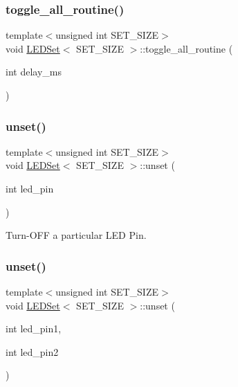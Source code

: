 \mbox{\label{classLEDSet_a61cc024950a5b66dff34c449cc73787f}} 
\subsubsection{\texorpdfstring{toggle\+\_\+all\+\_\+routine()}{toggle\_all\_routine()}}
{\footnotesize\ttfamily template$<$unsigned int S\+E\+T\+\_\+\+S\+I\+ZE$>$ \\
void \hyperlink{classLEDSet}{L\+E\+D\+Set}$<$ S\+E\+T\+\_\+\+S\+I\+ZE $>$\+::toggle\+\_\+all\+\_\+routine (\begin{DoxyParamCaption}\item[{int}]{delay\+\_\+ms }\end{DoxyParamCaption})\hspace{0.3cm}{\ttfamily [inline]}}

\mbox{\label{classLEDSet_aacc3566d74c4051350977b578ada3a4d}} 
\subsubsection{\texorpdfstring{unset()}{unset()}\hspace{0.1cm}{\footnotesize\ttfamily [1/3]}}
{\footnotesize\ttfamily template$<$unsigned int S\+E\+T\+\_\+\+S\+I\+ZE$>$ \\
void \hyperlink{classLEDSet}{L\+E\+D\+Set}$<$ S\+E\+T\+\_\+\+S\+I\+ZE $>$\+::unset (\begin{DoxyParamCaption}\item[{int}]{led\+\_\+pin }\end{DoxyParamCaption})\hspace{0.3cm}{\ttfamily [inline]}}



Turn-\/\+O\+FF a particular L\+ED Pin. 

\mbox{\label{classLEDSet_ac84aa5b9e72689bbfd71f556995dfe03}} 
\subsubsection{\texorpdfstring{unset()}{unset()}\hspace{0.1cm}{\footnotesize\ttfamily [2/3]}}
{\footnotesize\ttfamily template$<$unsigned int S\+E\+T\+\_\+\+S\+I\+ZE$>$ \\
void \hyperlink{classLEDSet}{L\+E\+D\+Set}$<$ S\+E\+T\+\_\+\+S\+I\+ZE $>$\+::unset (\begin{DoxyParamCaption}\item[{int}]{led\+\_\+pin1,  }\item[{int}]{led\+\_\+pin2 }\end{DoxyParamCaption})\hspace{0.3cm}{\ttfamily [inline]}}



